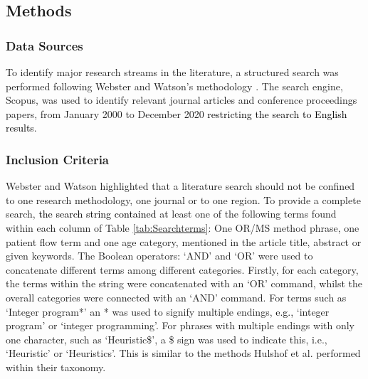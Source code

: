\documentclass[../thesis.tex]{subfiles}
\begin{document}


\subsection{Methods} \label{sec:SC}
 
\subsubsection{Data Sources}
To identify major research streams in the literature, a structured search was performed following Webster and Watson's methodology \cite{Webster}. The search engine, Scopus, was used to identify relevant journal articles and conference proceeding\textcolor{black}{s} papers, from January 2000 to December 2020 \textcolor{black}{restricting the search to English results}.

\subsubsection{Inclusion Criteria}
Webster and Watson \cite{Webster} highlighted that a literature search should not be confined to one research methodology, one journal or to one region. To provide a complete search, \textcolor{black}{the search string contained} at least one of the following terms found within each column of Table \ref{tab:Searchterms}: One OR/MS method phrase, one patient flow term and one age category, mentioned in the article title, abstract or given keywords. The Boolean operators\textcolor{black}{:} `AND' and `OR' were used to concatenate different terms among different categories. Firstly, for each category, the terms within the string were concatenated with an `OR' command, whilst the overall categories were connected with an `AND' command. For terms such as `Integer program*' an * was used to signify multiple endings, \textcolor{black}{e.g.,} `integer program' or `integer programming'. For phrases with multiple endings with only one character, such as `Heuristic\$', a \$ sign was used to indicate this, i.e., `Heuristic' or `Heuristics'. This is similar to the methods Hulshof et al. \cite{PHulshof} performed within their taxonomy. 
\end{document}
